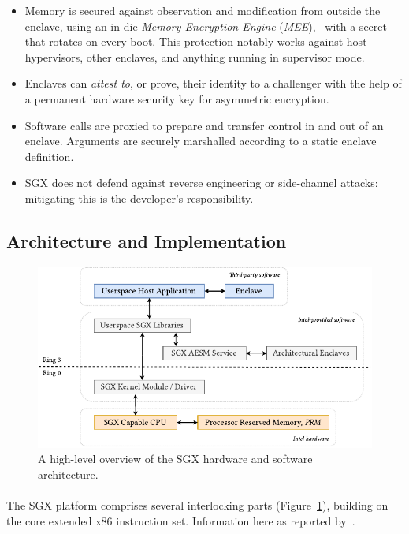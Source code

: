 \begin{itemize}
    \item Memory is secured against observation and modification from outside the enclave, using an in-die \textit{Memory Encryption Engine} (\textit{MEE}),~\cite{sgx-mee} with a secret that rotates on every boot. This protection notably works against host hypervisors, other enclaves, and anything running in supervisor mode.
    \item Enclaves can \textit{attest to}, or prove, their identity to a challenger with the help of a permanent hardware security key for asymmetric encryption.
    \item Software calls are proxied to prepare and transfer control in and out of an enclave. Arguments are securely marshalled according to a static enclave definition.
    \item SGX does not defend against reverse engineering or side-channel attacks:~\cite{10.1109/SP.2015.45} mitigating this is the developer's responsibility.
\end{itemize}

\subsection{Architecture and Implementation}

\begin{figure}[]
    \centering
    \includegraphics[width=0.9\linewidth]{figures/SGX-AdvArchitecture.pdf}
    \caption{A high-level overview of the SGX hardware and software architecture.}
    \label{fig:sgx-advarch}
\end{figure}

\paragraph{} The SGX platform comprises several interlocking parts (Figure~\ref{fig:sgx-advarch}), building on the core extended x86 instruction set. Information here as reported by~\cite{sgx-sgx-reference,Costan2016IntelSE}.

